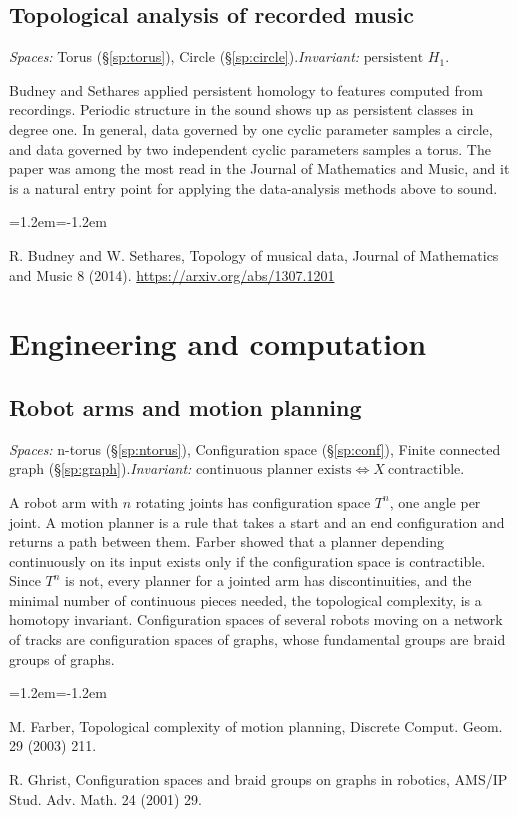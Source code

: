 \documentclass[11pt,twoside]{book}
\begin{document}
\subsection{Topological analysis of recorded music}\label{app:app-musicdata}
\noindent\textit{Spaces:} Torus (\S\ref{sp:torus}), Circle (\S\ref{sp:circle}).\enspace\textit{Invariant:} $\text{persistent }H_1$.

Budney and Sethares applied persistent homology to features computed from recordings. Periodic structure in the sound shows up as persistent classes in degree one. In general, data governed by one cyclic parameter samples a circle, and data governed by two independent cyclic parameters samples a torus. The paper was among the most read in the Journal of Mathematics and Music, and it is a natural entry point for applying the data-analysis methods above to sound.
\begin{list}{}{\leftmargin=1.2em\itemindent=-1.2em\itemsep=0pt}\small \item R. Budney and W. Sethares, Topology of musical data, Journal of Mathematics and Music 8 (2014). \url{https://arxiv.org/abs/1307.1201}\end{list}
\section{Engineering and computation}
\subsection{Robot arms and motion planning}\label{app:app-robots}
\noindent\textit{Spaces:} n-torus (\S\ref{sp:ntorus}), Configuration space (\S\ref{sp:conf}), Finite connected graph (\S\ref{sp:graph}).\enspace\textit{Invariant:} $\text{continuous planner exists}\iff X\ \text{contractible}$.

A robot arm with $n$ rotating joints has configuration space $T^n$, one angle per joint. A motion planner is a rule that takes a start and an end configuration and returns a path between them. Farber showed that a planner depending continuously on its input exists only if the configuration space is contractible. Since $T^n$ is not, every planner for a jointed arm has discontinuities, and the minimal number of continuous pieces needed, the topological complexity, is a homotopy invariant. Configuration spaces of several robots moving on a network of tracks are configuration spaces of graphs, whose fundamental groups are braid groups of graphs.
\begin{list}{}{\leftmargin=1.2em\itemindent=-1.2em\itemsep=0pt}\small \item M. Farber, Topological complexity of motion planning, Discrete Comput. Geom. 29 (2003) 211.\item R. Ghrist, Configuration spaces and braid groups on graphs in robotics, AMS/IP Stud. Adv. Math. 24 (2001) 29.\end{list}
\end{document}
